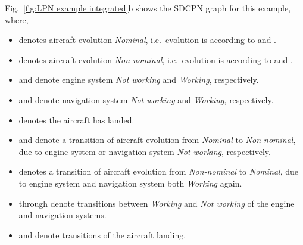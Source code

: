 \documentclass[copyright,creativecommons]{eptcs}
\begin{document}
Fig.\ \ref{fig:LPN example integrated}b shows
the SDCPN graph for this example, where,
\begin{itemize}
\item  denotes aircraft evolution {\em Nominal}, i.e.\
evolution is
      according to  and .
\item  denotes aircraft evolution {\em Non-nominal}, i.e.\
evolution is
      according to  and .
\item  and  denote engine system {\em Not working} and
{\em
      Working}, respectively.
\item  and  denote navigation system {\em Not working}
and {\em
      Working}, respectively.
\item  denotes the aircraft has landed. \item  and
 denote a transition of aircraft evolution from
      {\em Nominal} to {\em Non-nominal}, due to engine system or
      navigation system {\em Not working}, respectively.
\item  denotes a transition of aircraft evolution from {\em
      Non-nominal} to {\em Nominal}, due to engine system and navigation
      system both {\em Working} again.
\item  through  denote transitions between {\em Working}
and {\em
      Not working} of the engine and navigation systems.
\item  and  denote transitions of the aircraft landing.

\end{itemize}
\end{document}
